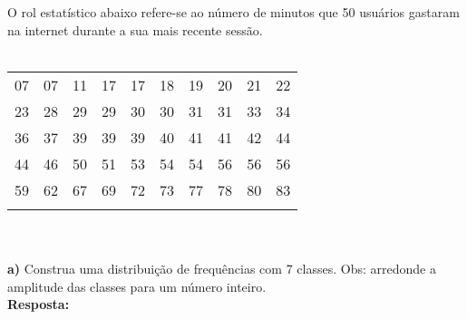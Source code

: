 \documentclass{article}
\begin{document}
O rol estatístico abaixo refere-se ao número de minutos que 50 usuários gastaram na internet durante a sua mais recente sessão.
\\
\\

\begin{center}

\begin{tabular}{llllllllll}

07 & 07 & 11 & 17 & 17 & 18 & 19 & 20 & 21 & 22 \\
23 & 28 & 29 & 29 & 30 & 30 & 31 & 31 & 33 & 34 \\
36 & 37 & 39 & 39 & 39 & 40 & 41 & 41 & 42 & 44 \\
44 & 46 & 50 & 51 & 53 & 54 & 54 & 56 & 56 & 56 \\
59 & 62 & 67 & 69 & 72 & 73 & 77 & 78 & 80 & 83 \\

\\
\end{tabular}
\end{center}
\begin{flushleft}

\\
\\

\textbf{a)}
Construa uma distribuição de frequências com 7 classes. Obs: arredonde a amplitude das classes para um número inteiro.
\\

\textbf{Resposta:}

\\

\end{flushleft}
\begin{center}
\end{center}
\end{document}
